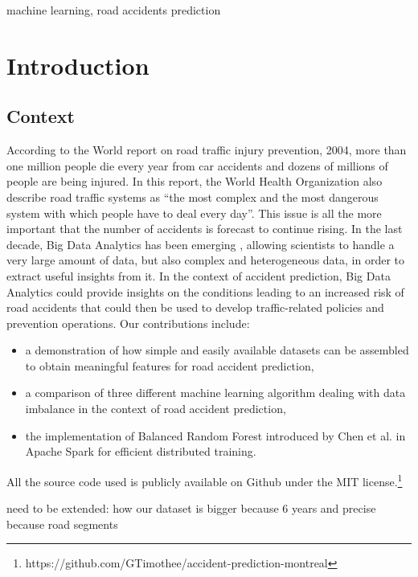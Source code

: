 \documentclass[conference]{IEEEtran}
\begin{document}
\begin{IEEEkeywords}
machine learning, road accidents prediction
\end{IEEEkeywords}

\section{Introduction}
\subsection{Context}
According to the World report on road traffic injury prevention, 2004, more than one million people die every year from car accidents and dozens of millions of people are being injured\cite{Peden2004}. In this report, the World Health Organization also describe road traffic systems as “the most complex and the most dangerous system with which people have to deal every day”. This issue is all the more important that the number of accidents is forecast to continue rising. In the last decade, Big Data Analytics has been emerging \cite{Gandomi2015}, allowing scientists to handle a very large amount of data, but also complex and heterogeneous data, in order to extract useful insights from it. In the context of accident prediction, Big Data Analytics could provide insights on the conditions leading to an increased risk of road accidents that could then be used to develop traffic-related policies and prevention operations. Our contributions include: 
\begin{itemize}
\item a demonstration of how simple and easily available datasets can be assembled to obtain meaningful features for road accident prediction,
\item a comparison of three different machine learning algorithm dealing with data imbalance in the context of road accident prediction,
\item the implementation of Balanced Random Forest introduced by Chen et al.\cite{Chen2004} in Apache Spark for efficient distributed training. 
\end{itemize}
All the source code used is publicly available on Github under the MIT license.\footnote{https://github.com/GTimothee/accident-prediction-montreal}

need to be extended:
  how our dataset is bigger because 6 years and precise because road segments
\end{document}
